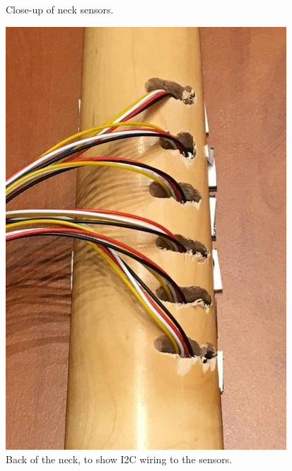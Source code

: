 \begin{appendices}
\begin{figure}[h]
    \caption{Close-up of neck sensors.}
    \label{fig:my_label}
\end{figure}
\begin{figure}[h]
    \centering
    \includegraphics[scale=0.6]{Images/back.jpg}
    \caption{Back of the neck, to show I2C wiring to the sensors.}
    \label{fig:my_label}
\end{figure}

\clearpage

\end{appendices}
